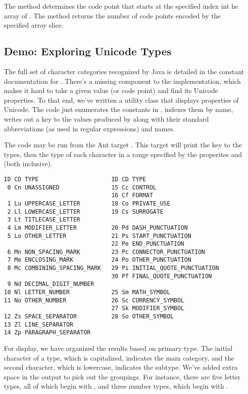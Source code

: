 The method  determines the code point
that starts at the specified index int he array of .  The
method  returns the number of
code points encoded by the specified  array slice.

\subsection{Demo: Exploring Unicode Types}\label{section:char-unicode-types}

The full set of character categories recognized by Java is detailed in
the constant documentation for .  There's a
missing component to the implementation, which makes it hard to take a
given  value (or code point) and find its Unicode
properties.  To that end, we've written a utility class
 that displays properties of Unicode.  The
code just enumerates the constants in , indexes them
by name, writes out a key to the values produced by
 along with their standard abbreviations
(as used in regular expressions) and names.

The code may be run from the Ant target .
This target will print the key to the types, then the type of
each character in a range specified by the properites 
 and  (both inclusive).
%
\begin{verbatim}
ID CD TYPE                     ID CD TYPE
 0 Cn UNASSIGNED               15 Cc CONTROL
                               16 Cf FORMAT
 1 Lu UPPERCASE_LETTER         18 Co PRIVATE_USE
 2 Ll LOWERCASE_LETTER         19 Cs SURROGATE
 3 Lt TITLECASE_LETTER         
 4 Lm MODIFIER_LETTER          20 Pd DASH_PUNCTUATION
 5 Lo OTHER_LETTER             21 Ps START_PUNCTUATION
                               22 Pe END_PUNCTUATION
 6 Mn NON_SPACING_MARK         23 Pc CONNECTOR_PUNCTUATION
 7 Me ENCLOSING_MARK           24 Po OTHER_PUNCTUATION
 8 Mc COMBINING_SPACING_MARK   29 Pi INITIAL_QUOTE_PUNCTUATION
                               30 Pf FINAL_QUOTE_PUNCTUATION
 9 Nd DECIMAL_DIGIT_NUMBER     
10 Nl LETTER_NUMBER            25 Sm MATH_SYMBOL
11 No OTHER_NUMBER             26 Sc CURRENCY_SYMBOL
                               27 Sk MODIFIER_SYMBOL
12 Zs SPACE_SEPARATOR          28 So OTHER_SYMBOL
13 Zl LINE_SEPARATOR           
14 Zp PARAGRAPH_SEPARATOR      
\end{verbatim}
%
For display, we have organized the results based on primary type.  The
initial character of a type, which is capitalized, indicates the main
category, and the second character, which is lowercase, indicates the
subtype.  We've added extra space in the output to pick out the
groupings.  For instance, there are five letter types, all of which
begin with , and three number types, which begin with
.

